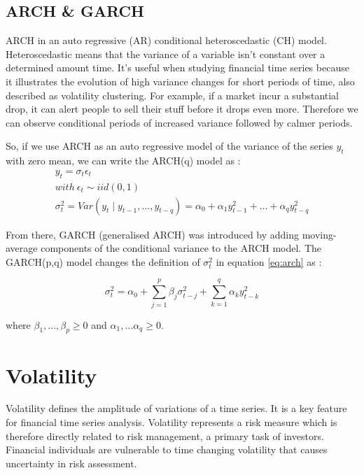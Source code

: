 \documentclass[11pt,a4paper,oneside]{book}
\begin{document}
\subsection{ARCH \& GARCH}

ARCH in an auto regressive (AR) conditional heteroscedastic (CH) model. Heteroscedastic means that the variance of a variable isn't constant over a determined amount time. It's useful when studying financial time series because it illustrates the evolution of high variance changes for short periods of time, also described as volatility clustering. For example, if a market incur a substantial drop, it can alert people to sell their stuff before it drops even more. Therefore we can observe conditional periods of increased variance followed by calmer periods. \cite{Holan}

So, if we use ARCH as an auto regressive model of the variance of the series $y_t$ with zero mean, we can write the ARCH(q) model as : 
\begin{equation}\label{eq:arch}
\begin{matrix}
y_t = \sigma_t \epsilon_t \\
with \ \epsilon_t \sim iid(0,1) \\
\sigma_t^2 = Var(y_t \mid y_{t-1},..., y_{t-q}) = \alpha_0 + \alpha_1 y_{t-1}^2 + ... + \alpha_q y_{t-q}^2
\end{matrix}
\end{equation}


From there, GARCH (generalised ARCH) was introduced by adding moving-average components of the conditional variance to the ARCH model. The GARCH(p,q) model changes the definition of $\sigma_t^2$ in equation \ref{eq:arch} as : 

\begin{equation}
\sigma_t^2 = \alpha_0 + \sum_{j=1}^p\beta_j \sigma_{t-j}^2 + \sum_{k=1}^q\alpha_k y_{t-k}^2 
\end{equation}

where $ \beta_1,..., \beta_p \geq 0$ and $\alpha_1,...\alpha_q \geq 0$. \cite{Holan}



\section{Volatility}

Volatility defines the amplitude of variations of a time series. It is a key feature for financial time series analysis. Volatility represents a risk measure which is therefore directly related to risk management, a primary task of investors. Financial individuals are vulnerable to time changing volatility that causes uncertainty in risk assessment. 
\end{document}
